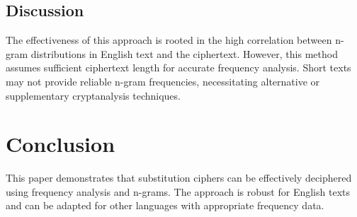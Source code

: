 \documentclass[12pt]{article}
\begin{document}
\subsection{Discussion}
The effectiveness of this approach is rooted in the high correlation between n-gram distributions in English text and the ciphertext. However, this method assumes sufficient ciphertext length for accurate frequency analysis. Short texts may not provide reliable n-gram frequencies, necessitating alternative or supplementary cryptanalysis techniques.

\section{Conclusion}
This paper demonstrates that substitution ciphers can be effectively deciphered using frequency analysis and n-grams. The approach is robust for English texts and can be adapted for other languages with appropriate frequency data.
\end{document}
